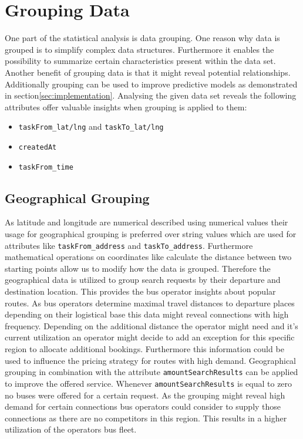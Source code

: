 \section{Grouping Data}
One part of the statistical analysis is data grouping. One reason why data is grouped is to simplify complex data structures. Furthermore it enables the possibility to summarize certain characteristics present within the data set. Another benefit of grouping data is that it might reveal potential relationships. Additionally grouping can be used to improve predictive models as demonstrated in section\ref{sec:implementation}.
Analysing the given data set reveals the following attributes offer valuable insights when grouping is applied to them: 
\begin{itemize}
\item \verb|taskFrom_lat/lng| and \verb|taskTo_lat/lng|
\item \verb|createdAt|
\item \verb|taskFrom_time|
\end{itemize}
\subsection{Geographical Grouping}
As latitude and longitude are numerical described using numerical values their usage for geographical grouping is preferred over string values which are used for attributes like \verb|taskFrom_address| and \verb|taskTo_address|. Furthermore mathematical operations on coordinates like calculate the distance between two starting points allow us to modify how the data is grouped. Therefore the geographical data is utilized to group search requests by their departure and destination location. This provides the bus operator insights about popular routes. As bus operators determine maximal travel distances to departure places depending on their logistical base this data might reveal connections with high frequency. Depending on the additional distance the operator might need and it's current utilization an operator might decide to add an exception for this specific region to allocate additional bookings. Furthermore this information could be used to influence the pricing strategy for routes with high demand.
Geographical grouping in combination with the attribute \verb|amountSearchResults| can be applied to improve the offered service. Whenever \verb|amountSearchResults| is equal to zero no buses were offered for a certain request. As the grouping might reveal high demand for certain connections bus operators could consider to supply those connections as there are no competitors in this region. This results in a higher utilization of the operators bus fleet. 
